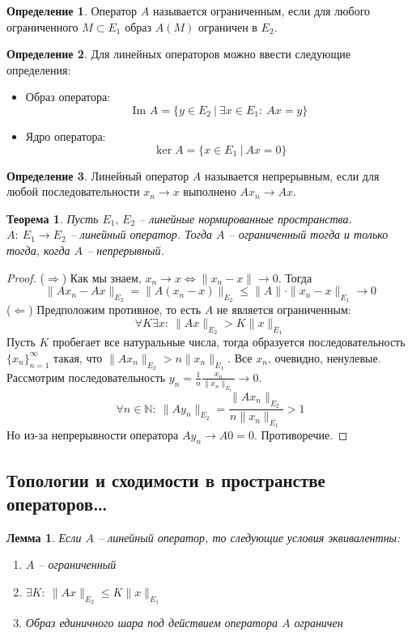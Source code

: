 \documentclass[a4paper,12pt]{article}
\renewcommand{\leq}{\ensuremath{\leqslant}}
\theoremstyle{plain}
\newtheorem{theorem}{Теорема}[section]
\newtheorem{lemma}{Лемма}[section]
\theoremstyle{definition}
\newtheorem{definition}{Определение}[section]
\theoremstyle{remark}
\begin{document}
\begin{definition}
	Оператор $A$ называется ограниченным, если для любого ограниченного $M \subset E_1$ образ $A(M)$ ограничен в $E_2$.
\end{definition}

\begin{definition}
	Для линейных операторов можно ввести следующие определения:
	\begin{itemize}
		\item Образ оператора:
		      \[
			      \text{Im } A = \{y \in E_2 \:\vert\: \exists x \in E_1 :\: Ax = y\}
		      \]
		\item Ядро оператора:
		      \[
			      \ker A = \{x \in E_1 \:\vert\: Ax = 0\}
		      \]
	\end{itemize}
\end{definition}

\begin{definition}
	Линейный оператор $A$ называется непрерывным, если для любой последовательности $x_n \to x$ выполнено $Ax_n \to Ax$.
\end{definition}

\begin{theorem}
	Пусть $E_1,\,E_2$ -- линейные нормированные пространства. $A :\: E_1 \to E_2$ -- линейный оператор. Тогда $A$ -- ограниченный тогда и только тогда, когда $A$ -- непрерывный.
\end{theorem}

\begin{proof}
	($\Rightarrow$) Как мы знаем, $x_n \to x \Leftrightarrow \|x_n - x\| \to 0$. Тогда
	\[
		\|Ax_n - Ax\|_{E_2} = \|A(x_n - x)\|_{E_2} \leq \|A\| \cdot\|x_n - x\|_{E_1} \to 0
	\]
	($\Leftarrow$) Предположим противное, то есть $A$ не является ограниченным:
	\[
		\forall K \exists x :\: \|Ax\|_{E_2} > K\|x\|_{E_1}
	\]
	Пусть $K$ пробегает все натуральные числа, тогда образуется последовательность $\{x_n\}_{n=1}^\infty$ такая, что $\|Ax_n\|_{E_2} > n\|x_n\|_{E_1}$. Все $x_n$, очевидно, ненулевые. Рассмотрим последовательность $y_n = \frac{1}{n}\frac{x_n}{\|x_n\|_{E_1}} \to 0$.
	\[
		\forall n \in \mathbb{N} :\: \|Ay_n\|_{E_2} = \frac{\|Ax_n\|_{E_2}}{n\|x_n\|_{E_1}} > 1
	\]
	Но из-за непрерывности оператора $Ay_n \to A0 = 0$. Противоречие.
\end{proof}

\subsection{Топологии и сходимости в пространстве операторов\dots}
\begin{lemma}
	Если $A$ -- линейный оператор, то следующие условия эквивалентны:
	\begin{enumerate}
		\item $A$ -- ограниченный
		\item $\exists K :\: \|Ax\|_{E_2} \leq K\|x\|_{E_1}$
		\item Образ единичного шара под действием оператора $A$ ограничен
	\end{enumerate}
\end{lemma}
\end{document}

